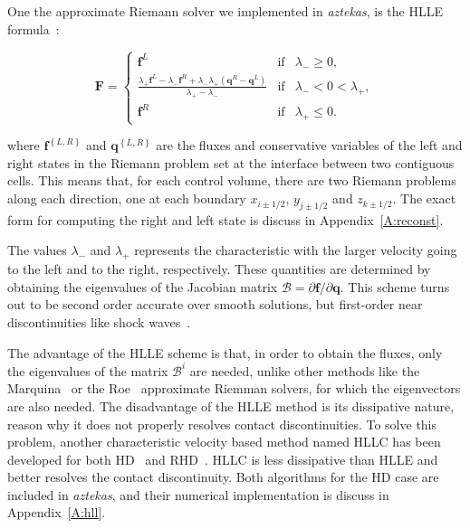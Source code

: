 One the approximate Riemann solver we implemented in \textit{aztekas}, is the HLLE  formula~\citep{hll1983,einfeldt1988}:

\begin{equation}  
   \mathbf{{F}} = \left\lbrace
   \begin{array}{ccc}
   \mathbf{f}^L & \mathrm{if} & \lambda_{-} \geq 0, \\
   \frac{\lambda_{+} \mathbf{f}^L - \lambda_{-} \mathbf{f}^R +
   \lambda_{-} \lambda_{+} \left( \mathbf{q}^R - \mathbf{q}^L
\right)}{\lambda_{+} - \lambda_{-}} & \mathrm{if} & \lambda_{-} < 0 <
\lambda_{+} ,\\ 
   \mathbf{f}^R & \mathrm{if} & \lambda_{+} \leq 0 .
   \end{array} 
   \right.
\label{eq:hll}
\end{equation}

\noindent where $\mathbf{f}^{\left\lbrace L,R \right\rbrace}$ and $\mathbf{q}^{\left\lbrace L,R \right\rbrace}$ are the fluxes and conservative variables of the left and right states in the Riemann problem set at the interface between two contiguous cells. This means that, for each control volume, there are two Riemann problems along each direction, one at each boundary $x_{i\pm 1/2}$, $y_{j \pm 1/2}$ and $z_{k \pm 1/2}$. The exact form for computing the right and left state is discuss in Appendix~\ref{A:reconst}.

The values $\lambda_{-}$ and $\lambda_{+}$ represents the characteristic with the larger velocity going to the left and to the right, respectively. These quantities are determined by obtaining the eigenvalues of the Jacobian matrix $\mathcal{B} = \partial \mathbf{f}/ \partial \mathbf{q}$. This scheme turns out to be second order accurate over smooth solutions, but first-order near discontinuities like shock waves~\citep{toro2009}.

The advantage of the HLLE scheme is that, in order to obtain the fluxes, only the eigenvalues of the matrix $\mathcal{B}^i$ are needed, unlike other methods like the Marquina~\citep{marquina1994} or the Roe~\citep{roe1981} approximate Riemman solvers, for which the eigenvectors are also needed. The disadvantage of the HLLE method is its dissipative nature, reason why it does not properly resolves contact discontinuities. To solve this problem, another characteristic velocity based method named HLLC has been developed for both HD~\citep[see][]{toro1994} and RHD~\citep[see][]{mignone2005}. HLLC is less dissipative than HLLE and better resolves the contact discontinuity. Both algorithms for the HD case are included in \textit{aztekas}, and their numerical implementation is discuss in Appendix~\ref{A:hll}.

